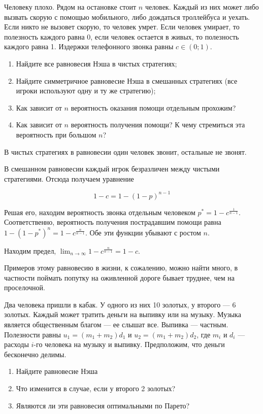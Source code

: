 \begin{problem}
Человеку плохо. Рядом на остановке стоит $n$  человек. Каждый из них может либо вызвать скорую с помощью мобильного, либо дождаться троллейбуса и уехать. Если никто не вызовет скорую, то человек умрет. Если человек умирает, то полезность каждого равна 0, если человек остается в живых, то полезность каждого равна 1. Издержки телефонного звонка равны  $c\in \left(0;1\right)$.
\begin{enumerate}
\item  Найдите все равновесия Нэша в чистых стратегиях;
\item  Найдите симметричное равновесие Нэша в смешанных стратегиях (все игроки используют одну и ту же стратегию);
\item  Как зависит от  $n$  вероятность оказания помощи отдельным прохожим?
\item Как зависит от  $n$  вероятность получения помощи? К чему стремиться эта вероятность при большом $n$?
\end{enumerate}
\end{problem}

\begin{solution}
В чистых стратегиях в равновесии один человек звонит, остальные не звонят. 

В смешанном равновесии каждый игрок безразличен между чистыми стратегиями. Отсюда получаем уравнение

\[
1-c=1-(1-p)^{n-1}
\]

Решая его, находим вероятность звонка отдельным человеком $p^*=1-c^{\frac{1}{n-1}}$. Соответственно, вероятность получения пострадавшим помощи равна $1-(1-p^*)^n=1-c^{\frac{n}{n-1}}$. Обе эти функции убывают с ростом $n$.

Находим предел, $\lim_{n\to\infty} 1-c^{\frac{n}{n-1}} = 1-c$.

Примеров этому равновесию в жизни, к сожалению, можно найти много, в частности поймать попутку на оживленной дороге бывает труднее, чем на проселочной.

\end{solution}

\begin{problem} 
Два человека пришли в кабак. У одного из них 10 золотых, у второго --- 6 золотых. Каждый может тратить деньги на выпивку или на музыку.
Музыка является общественным благом --- ее слышат все. Выпивка --- частным. Полезности равны $u_{1}=(m_{1}+m_{2})d_{1}$ и
$u_{2}=(m_{1}+m_{2})d_{2}$, где $m_{i}$ и $d_{i}$ --- расходы $i$-го
человека на музыку и выпивку. Предположим, что деньги бесконечно
делимы. 
\begin{enumerate}
\item Найдите равновесие Нэша 
\item Что изменится в случае, если у второго 2 золотых? 
\item Являются ли эти равновесия оптимальными по Парето? 
\end{enumerate}
\end{problem}


